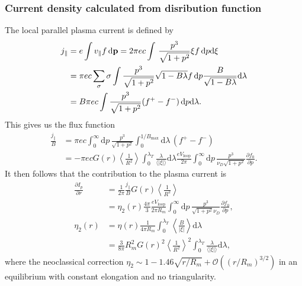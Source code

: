 \documentclass[11pt,a4paper]{article}
\newcommand{\rd}{\ensuremath{\mathrm{d}}}
\newcommand{\Ordo}{\ensuremath{\mathcal{O}}}%
\newcommand{\sub}[1]{\ensuremath{_{\text{#1}}}}
\renewcommand{\b}[1]{\ensuremath{ {\bf #1 } }}
\begin{document}
\subsubsection*{Current density calculated from disribution function}
The local parallel plasma current is defined by
\begin{align}
j_\parallel &= e\int v_\parallel f \,\rd\b{p} = 2\pi ec \int \, \frac{p^3}{\sqrt{1+p^2}}\xi f \,\rd p\rd\xi \nonumber \\
&= \pi ec \sum_\sigma \sigma \int \frac{p^3}{\sqrt{1+p^2}}\sqrt{1-B\lambda}  f \, \rd p \frac{B}{\sqrt{1-B\lambda}}  \rd \lambda \nonumber \\
&= B \pi ec \int \frac{p^3}{\sqrt{1+p^2}} (f^+-f^-) \,\rd p \rd \lambda.
\end{align}
This gives us the flux function 
\begin{align}
\frac{j_\parallel}{B} &= \pi ec \int_0^\infty \rd p \, \frac{p^3}{\sqrt{1+p^2}} \int_0^{1/B\sub{max}} \rd \lambda \,(f^+-f^-) \nonumber \\
&= -\pi e c G(r)\left\langle\frac{1}{R^2}\right\rangle \int_0^{\lambda_T}\frac{\lambda}{\langle|\xi|\rangle}\rd\lambda \frac{eV\sub{loop}}{2\pi}\int_0^\infty \rd p \, \frac{p^3}{\nu_D \sqrt{1+p^2}}\frac{\partial f_0}{\partial p}.
\end{align}
It then follows that the contribution to the plasma current is
\begin{align}
\frac{\partial I_p}{\partial r} &= \frac{1}{2\pi}\frac{j_\parallel}{B}G(r)\left\langle\frac{1}{R^2}\right\rangle \nonumber \\
&= \eta_2(r)\frac{4\pi}{3}\frac{eV\sub{loop}}{2\pi R_m} \int_0^\infty \rd p \,\frac{p^3}{\sqrt{1+p^2}\nu_D}\frac{\partial f_0}{\partial p}, \nonumber \\
\eta_2(r) &=\eta(r) \frac{1}{4\pi R_m}\int_0^{\lambda_T}\left\langle\frac{B}{|\xi|}\right\rangle\rd\lambda \nonumber \\
&=\frac{3}{8\pi} R_m^2G(r)^2\left\langle\frac{1}{R^2}\right\rangle^2 \int_0^{\lambda_T} \frac{\lambda}{\langle|\xi|\rangle}\rd\lambda,
\end{align}
where the neoclassical correction $\eta_2 \sim 1-1.46\sqrt{r/R_m} + \Ordo((r/R_m)^{3/2})$ in an equilibrium with constant elongation and no triangularity.
\end{document}

